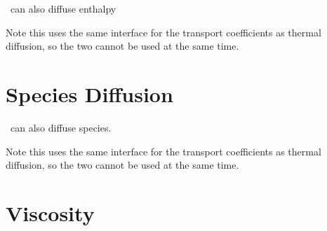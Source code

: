 \castro\ can also diffuse enthalpy 

Note this uses the same interface for the transport coefficients as
thermal diffusion, so the two cannot be used at the same time.


\section{Species Diffusion}

\castro\ can also diffuse species.  

Note this uses the same interface for the transport coefficients as
thermal diffusion, so the two cannot be used at the same time.



\section{Viscosity}

